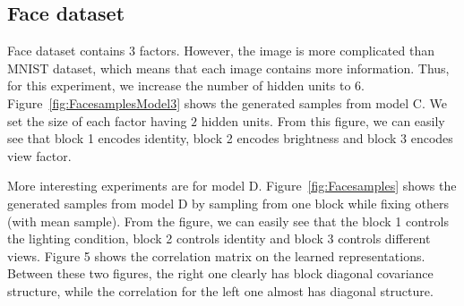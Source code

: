 \subsection{Face dataset}
Face dataset contains $3$ factors. However, the image is more complicated than MNIST dataset, which means that each image contains more information. Thus, for this experiment, we increase the number of hidden units to $6$. Figure~\ref{fig:FacesamplesModel3} shows the generated samples from model C. We set the size of each factor having $2$ hidden units. From this figure, we can easily see that block 1 encodes identity, block 2 encodes brightness and block 3 encodes view factor.

More interesting experiments are for model D. Figure~\ref{fig:Facesamples} shows the generated samples from model D by sampling from one block while fixing others (with mean sample). From the figure, we can easily see that the block 1 controls the lighting condition, block 2 controls identity and block 3 controls different views. Figure 5 shows the correlation matrix on the learned representations. Between these two figures, the right one clearly has block diagonal covariance structure, while the correlation for the left one almost has diagonal structure.

